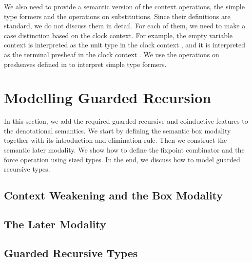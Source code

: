 \documentclass[a4paper,UKenglish,cleveref, autoref,numberwithinsect]{lipics-v2019}
\newcommand{\IC}{\AgdaInductiveConstructor}
\begin{document}
We also need to provide a semantic version of 
the context operations, the simple type formers and the operations on substitutions.
Since their definitions are standard, we do not discuss them in detail.
For each of them, we need to make a case distinction based on the clock context.
For example, the empty variable context \IC{•} is interpreted
as the unit type in the clock context \IC{∅}, and it is interpreted as 
the terminal presheaf in the clock context \IC{κ}.
We use the operations on presheaves defined in  to interpret simple type formers.


\section{Modelling Guarded Recursion}
\label{sec:guarded}
In this section, we add the required guarded
recursive and coinductive features to the denotational semantics.
We start by defining the semantic box modality together with its
introduction and elimination rule. Then we construct the semantic
later modality. We show how to define the fixpoint combinator and the
force operation using sized types. In the end, we discuss how to model
guarded recursive types.

\subsection{Context Weakening and the Box Modality}



\subsection{The Later Modality}
\label{sec:later}




\subsection{Guarded Recursive Types}
\label{sec:grt}

\end{document}
